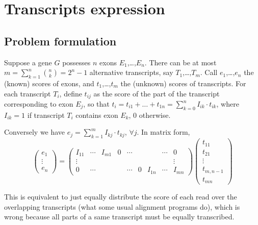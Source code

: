 \documentclass[a4paper,11pt]{article}
\begin{document}
\section{Transcripts expression}

\subsection{Problem formulation}

Suppose a gene $G$ possesses $n$ exons $E_1$,\ldots,$E_n$. There can be at most $m = \sum_{k=1}^n {n \choose k} = 2^{n}-1$ alternative transcripts, say $T_1$,\ldots,$T_{m}$. Call $e_1$,\ldots,$e_n$ the (known) scores of exons, and $t_1$,\ldots,$t_{m}$ the (unknown) scores of transcripts. For each transcript $T_i$, define $t_{ij}$ as the score of the part of the transcript corresponding to exon $E_j$, so that $t_i = t_{i1} + \ldots + t_{1n} = \sum_{k=0}^n I_{ik} \cdot t_{ik}$, where $I_{ik} = 1$ if transcript $T_i$ contains exon $E_k$, 0 otherwise.

Conversely we have $e_j = \sum_{k=1}^{m} I_{kj} \cdot t_{kj}$, $\forall j$. In matrix form,
$$
\begin{pmatrix}
e_1 \\ \vdots \\ e_n
\end{pmatrix}
=
\begin{pmatrix}
I_{11} & \cdots & I_{m1} & 0 & \cdots &   &      & \cdots & 0 \\
\vdots & &&&&&&& \vdots \\
0      & \cdots &        &   & \cdots & 0 &I_{1n} & \cdots & I_{mn}
\end{pmatrix}
\begin{pmatrix}
t_{11} \\ t_{21} \\ \vdots \\ t_{m,n-1} \\t_{mn}
\end{pmatrix}
$$

This is equivalent to just equally distribute the score of each read over the overlapping transcripts (what some usual alignment programs do), which is wrong because all parts of a same transcript must be equally transcribed. 
\end{document}
